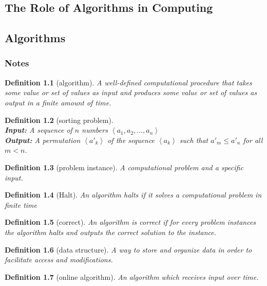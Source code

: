 \documentclass[oneside]{book}
\newtheorem{definition}{Definition}[chapter]
\newcommand{\seq}[1]{\left\langle #1 \right\rangle}
\begin{document}
\mainmatter
\begin{spacing}{1.618}
\chapter{The Role of Algorithms in Computing}
\section{Algorithms}
\subsection{Notes}
\begin{definition}[algorithm]
	A well-defined computational procedure that takes some value or set of values as input and produces some value or set of values as output in a finite amount of time.
\end{definition}

\begin{definition}[sorting problem]
	~\\
	\textbf{Input: } A sequence of $n$ numbers $\seq{a_1, a_2, \dots, a_n}$ \\
	\textbf{Output:} A permutation $\seq{a'_k}$ of the sequence $\seq{a_k}$ such that $a'_m \leq a'_n$ for all $m < n$. 
\end{definition}

\begin{definition}[problem instance]
	A computational problem and a specific input.
\end{definition}

\begin{definition}[Halt]
	An algorithm \emph{halts} if it solves a computational problem in finite time
\end{definition}

\begin{definition}[correct]
	An algorithm is \emph{correct} if for every problem instances the algorithm halts and outputs the correct solution to the instance.
\end{definition}

\begin{definition}[data structure]
	A way to store and organize data in order to facilitate access and modifications.
\end{definition}

\begin{definition}[online algorithm]
	An algorithm which receives input over time.
\end{definition}


\end{spacing}
\end{document}
